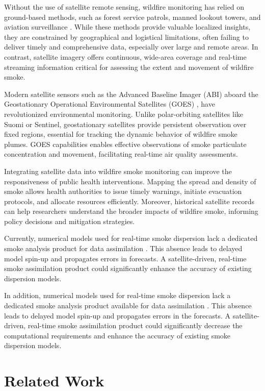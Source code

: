\documentclass{article}
\begin{document}
Without the use of satellite remote sensing, wildfire monitoring has relied on ground-based methods, such as forest service patrols, manned lookout towers, and aviation surveillance \cite{smoke_monitoring}. While these methods provide valuable localized insights, they are constrained by geographical and logistical limitations, often failing to deliver timely and comprehensive data, especially over large and remote areas. In contrast, satellite imagery offers continuous, wide-area coverage and real-time streaming information critical for assessing the extent and movement of wildfire smoke.

Modern satellite sensors such as the Advanced Baseline Imager (ABI) aboard the Geostationary Operational Environmental Satellites (GOES) \cite{goes}, have revolutionized environmental monitoring. Unlike polar-orbiting satellites like Suomi or Sentinel, geostationary satellites provide persistent observation over fixed regions, essential for tracking the dynamic behavior of wildfire smoke plumes. GOES capabilities enables effective observations of smoke particulate concentration and movement, facilitating real-time air quality assessments.

Integrating satellite data into wildfire smoke monitoring can improve the responsiveness of public health interventions. Mapping the spread and density of smoke allows health authorities to issue timely warnings, initiate evacuation protocols, and allocate resources efficiently. Moreover, historical satellite records can help researchers understand the broader impacts of wildfire smoke, informing policy decisions and mitigation strategies.


Currently, numerical models used for real-time smoke dispersion lack a dedicated smoke analysis product for data assimilation \cite{hrrr, rrfs}. This absence leads to delayed model spin-up and propagates errors in forecasts. A satellite-driven, real-time smoke assimilation product could significantly enhance the accuracy of existing dispersion models.

In addition, numerical models used for real-time smoke dispersion lack a dedicated smoke analysis product available for data assimilation \cite{hrrr, rrfs}. This absence leads to delayed model spin-up and propagates errors in the forecasts. A satellite-driven, real-time smoke assimilation product could significantly decrease the computational requirements and enhance the accuracy of existing smoke dispersion models. 

\section{Related Work}
\end{document}
